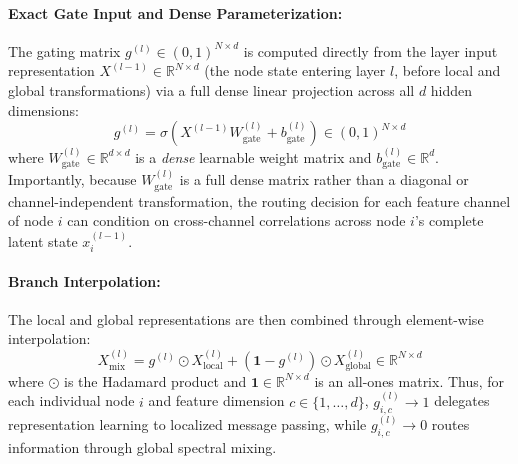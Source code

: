 \documentclass[10pt]{article}
\begin{document}
\paragraph{Exact Gate Input and Dense Parameterization:} The gating matrix $g^{(l)} \in (0, 1)^{N \times d}$ is computed directly from the layer input representation $X^{(l-1)} \in \mathbb{R}^{N \times d}$ (the node state entering layer $l$, before local and global transformations) via a full dense linear projection across all $d$ hidden dimensions:
\begin{equation}
\label{eq:gate}
g^{(l)} = \sigma\left( X^{(l-1)} W_{\text{gate}}^{(l)} + b_{\text{gate}}^{(l)} \right) \in (0, 1)^{N \times d}
\end{equation}
where $W_{\text{gate}}^{(l)} \in \mathbb{R}^{d \times d}$ is a \textit{dense} learnable weight matrix and $b_{\text{gate}}^{(l)} \in \mathbb{R}^d$. Importantly, because $W_{\text{gate}}^{(l)}$ is a full dense matrix rather than a diagonal or channel-independent transformation, the routing decision for each feature channel of node $i$ can condition on cross-channel correlations across node $i$'s complete latent state $x_i^{(l-1)}$.

\paragraph{Branch Interpolation:} The local and global representations are then combined through element-wise interpolation:
\begin{equation}
\label{eq:mix}
X^{(l)}_{\text{mix}} = g^{(l)} \odot X^{(l)}_{\text{local}} + \left( \mathbf{1} - g^{(l)} \right) \odot X^{(l)}_{\text{global}} \in \mathbb{R}^{N \times d}
\end{equation}
where $\odot$ is the Hadamard product and $\mathbf{1} \in \mathbb{R}^{N \times d}$ is an all-ones matrix. Thus, for each individual node $i$ and feature dimension $c \in \{1, \dots, d\}$, $g_{i, c}^{(l)} \to 1$ delegates representation learning to localized message passing, while $g_{i, c}^{(l)} \to 0$ routes information through global spectral mixing.
\end{document}

